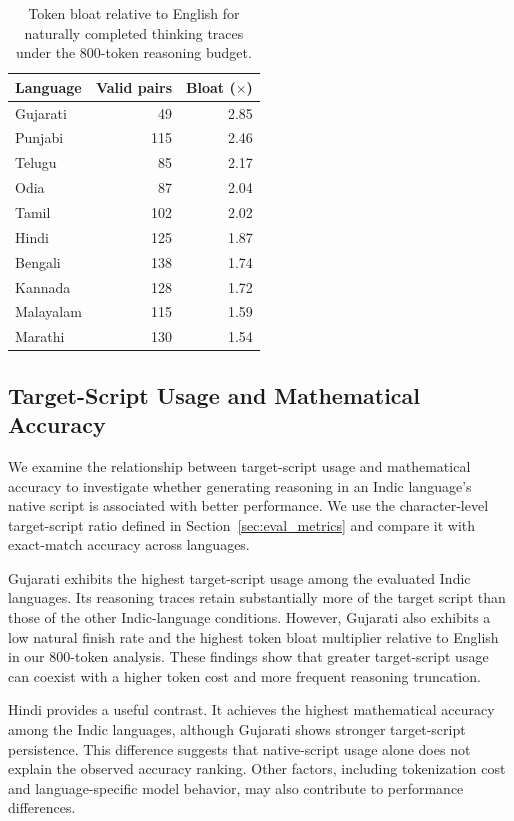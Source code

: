 \documentclass[11pt]{article}
\begin{document}
\begin{table}[t]
\centering
\small
\setlength{\tabcolsep}{4pt}
\renewcommand{\arraystretch}{1.12}
\caption{Token bloat relative to English for naturally completed
thinking traces under the 800-token reasoning budget.}
\label{tab:token_bloat}
\begin{tabular}{@{}lrr@{}}
\toprule
Language & Valid pairs & Bloat ($\times$) \\
\midrule
Gujarati  & 49  & 2.85 \\
Punjabi   & 115 & 2.46 \\
Telugu    & 85  & 2.17 \\
Odia      & 87  & 2.04 \\
Tamil     & 102 & 2.02 \\
Hindi     & 125 & 1.87 \\
Bengali   & 138 & 1.74 \\
Kannada   & 128 & 1.72 \\
Malayalam & 115 & 1.59 \\
Marathi   & 130 & 1.54 \\
\bottomrule
\end{tabular}
\end{table}

\subsection{Target-Script Usage and Mathematical Accuracy}

We examine the relationship between target-script usage and mathematical accuracy to investigate whether generating reasoning in an Indic language's native script is associated with better performance. We use the character-level target-script ratio defined in Section~\ref{sec:eval_metrics} and compare it with exact-match accuracy across languages.

Gujarati exhibits the highest target-script usage among the evaluated Indic languages. Its reasoning traces retain substantially more of the target script than those of the other Indic-language conditions. However, Gujarati also exhibits a low natural finish rate and the highest token bloat multiplier relative to English in our 800-token analysis. These findings show that greater target-script usage can coexist with a higher token cost and more frequent reasoning truncation.

Hindi provides a useful contrast. It achieves the highest mathematical accuracy among the Indic languages, although Gujarati shows stronger target-script persistence. This difference suggests that native-script usage alone does not explain the observed accuracy ranking. Other factors, including tokenization cost and language-specific model behavior, may also contribute to performance differences.
\end{document}
